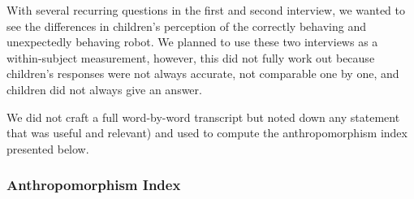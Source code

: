 \documentclass[letterpaper, 10pt, conference]{ieeeconf}
\newcommand{\eg}{{\textit{e.g.~}}}
\begin{document}
With several recurring questions in the first and second interview, we wanted to
see the differences in children's perception of the correctly behaving and
unexpectedly behaving robot. We planned to use these two interviews as a
within-subject measurement, however, this did not fully work out because
children's responses were not always accurate, not comparable one by one, and
children did not always give an answer.	



We did not craft a full word-by-word transcript but
noted down any statement that was useful and relevant) and used to compute the
anthropomorphism index presented below.

\subsubsection{Anthropomorphism Index}

%
%
\end{document}
